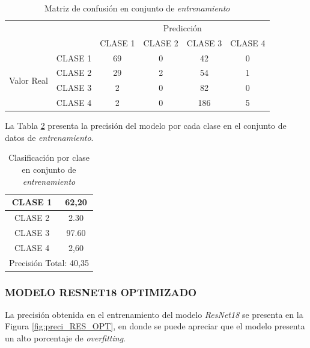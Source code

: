 \begin{table}[htbp]
	\centering
	\resizebox{11cm}{!} {
		\begin{tabular}{|c|l|c|c|c|c|}
			\hline
			\multicolumn{2}{|c|}{\multirow{2}[4]{*}{}} & \multicolumn{4}{c|}{Predicción} \bigstrut\\
			\cline{3-6}    \multicolumn{2}{|c|}{} & CLASE 1 & CLASE 2 & CLASE 3 & CLASE 4 \bigstrut\\
			\hline
			\multirow{4}[8]{*}{\begin{sideways}Valor Real\end{sideways}} & CLASE 1 & 69     & 0     & 42    & 0 \bigstrut\\
			\cline{2-6}          & CLASE 2 & 29     & 2     & 54    & 1 \bigstrut\\
			\cline{2-6}          & CLASE 3 & 2     & 0     & 82    & 0 \bigstrut\\
			\cline{2-6}          & CLASE 4 & 2     & 0     & 186    & 5 \bigstrut\\
			\hline
		\end{tabular}
	}
	\caption{Matriz de confusión en conjunto de \textit{entrenamiento}}
	\label{tab:MC_VGG11_OPT_2}%
\end{table}%

\newpage
La Tabla \ref{tab:VGG11optclases_2} presenta la precisión del modelo por cada clase en el conjunto de datos de \textit{entrenamiento}.

\begin{table}[htbp]
	\centering
	\begin{tabular}{|c|c|}
		\hline
		CLASE 1 & 62,20 \bigstrut\\
		\hline
		CLASE 2 & 2.30 \bigstrut\\
		\hline
		CLASE 3 & 97.60 \bigstrut\\
		\hline
		CLASE 4 & 2,60 \bigstrut\\
		\hline
		\multicolumn{2}{|c|}{Precisión Total: 40,35} \bigstrut\\
		\hline
	\end{tabular}%
	\caption{Clasificación por clase en conjunto de \textit{entrenamiento}}
	\label{tab:VGG11optclases_2}%
\end{table}%

\subsubsection{\MakeUppercase{Modelo ResNet18 Optimizado}}

La precisión obtenida en el entrenamiento del modelo \textit{ResNet18} se presenta en la Figura \ref{fig:preci_RES_OPT}, en donde se puede apreciar que el modelo presenta un alto porcentaje de \textit{overfitting}.

